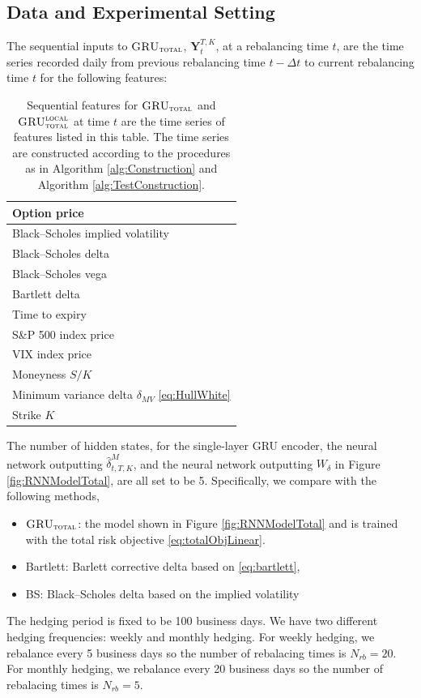 \documentclass[letterpaper,12pt,titlepage,oneside,final]{book}
\numberwithin{equation}{section}
\theoremstyle{definition}
\newcommand{\modelT}{\textsc{GRU}_{\textsc{total}}}
\newcommand{\modelL}{\textsc{GRU}_{\textsc{total}}^{\textsc{local}}}
\newcommand{\DT}{\Delta t}
\begin{document}
\subsection{Data and Experimental Setting}
The sequential inputs to $\modelT$, $\mathbf{Y}_{t}^{T,K}$, at a rebalancing time $t$, are the  time series recorded daily from previous rebalancing time $t-\DT$ to current rebalancing time $t$ for the following features:


\begin{table}[htp!]
	\centering
	\begin{tabular}{|l|}
		\hline
		Option  price\\ \hline
		Black–Scholes implied volatility\\
		\hline
		Black–Scholes delta\\
		\hline
		Black–Scholes vega \\
		\hline
		Bartlett delta \\
		\hline
		Time to expiry \\\hline
		S\&P 500 index price\\\hline
		VIX index price\\\hline
		Moneyness $S/K$\\\hline
		Minimum variance delta $\delta_{MV}$  \eqref{eq:HullWhite}\\\hline
		Strike $K$ \\   \hline
	\end{tabular}
	\caption{Sequential features for $\modelT$ and $\modelL$ at time $t$ are the  time series of features listed in this table. The time series are constructed according to the procedures as in Algorithm \ref{alg:Construction} and Algorithm \ref{alg:TestConstruction}.}
\end{table}

The number of hidden states, for the single-layer GRU encoder, the neural network outputting $\widehat{\delta}^M_{t,T,K}$, and the neural network outputting $W_{\delta}$  in Figure \ref{fig:RNNModelTotal}, are all set to be 5.  Specifically, we compare with the following methods,
\begin{itemize}
	\item $\modelT$: the model shown in Figure \ref{fig:RNNModelTotal} and is trained with the total risk objective \eqref{eq:totalObjLinear}.
	\item Bartlett: Barlett corrective  delta based on \eqref{eq:bartlett},
	\item BS: Black–Scholes delta based on the implied volatility 
\end{itemize}
The hedging period is fixed to be 100 business days. We have two different hedging frequencies: weekly and monthly hedging. For weekly hedging, we rebalance every 5 business days so the number of rebalacing times is $N_{rb}=20$. For monthly hedging, we rebalance every 20 business days so the number of rebalacing times is $N_{rb}=5$.
\end{document}
